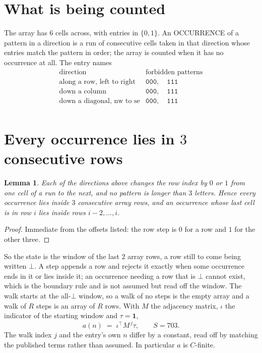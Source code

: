 \documentclass[11pt,a4paper]{article}
\theoremstyle{plain}
\newtheorem{lemma}[theorem]{Lemma}
\theoremstyle{definition}
\begin{document}
\section{What is being counted}

The array has $6$ cells across, with entries in $\{0,1\}$. An OCCURRENCE of a pattern in a
direction is a run of consecutive cells taken in that direction whose entries match the pattern
in order; the array is counted when it has no occurrence at all. The entry names
\[
\begin{array}{ll}
\text{direction} & \text{forbidden patterns} \\[2pt]
\text{along a row, left to right} & \mathtt{000},\quad \mathtt{111} \\
\text{down a column} & \mathtt{000},\quad \mathtt{111} \\
\text{down a diagonal, nw to se} & \mathtt{000},\quad \mathtt{111} \\
\end{array}
\]


\section{Every occurrence lies in $3$ consecutive rows}

\begin{lemma}\label{lem:win}
Each of the directions above changes the row index by $0$ or $1$ from one cell of a run to the
next, and no pattern is longer than $3$ letters. Hence every occurrence lies inside $3$
consecutive array rows, and an occurrence whose last cell is in row $i$ lies inside rows
$i-2,\dots,i$.
\end{lemma}

\begin{proof}
Immediate from the offsets listed: the row step is $0$ for a row and $1$ for the other three.
\end{proof}

So the state is the window of the last $2$ array rows, a row still to come being written
$\bot$. A step appends a row and rejects it exactly when some occurrence ends in it or lies
inside it; an occurrence needing a row that is $\bot$ cannot exist, which is the boundary rule
and is not assumed but read off the window. The walk starts at the all-$\bot$ window, so a walk
of no steps is the empty array and a walk of $R$ steps is an array of $R$ rows. With $M$ the
adjacency matrix, $\iota$ the indicator of the starting window and $\tau=\mathbf{1}$,
\[
a(n)\;=\;\iota^{\!\top}M^{\,j}\tau ,\qquad S=703.
\]
The walk index $j$ and the entry's own $n$ differ by a constant, read off by matching the
published terms rather than assumed. In particular $a$ is $C$-finite.
\end{document}
